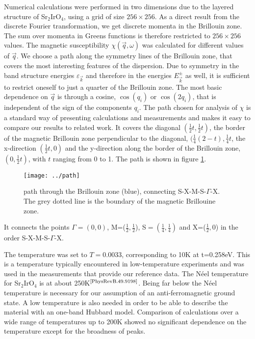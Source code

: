 \documentclass[a4paper,12pt]{report}
\begin{document}
Numerical calculations were performed in two dimensions due to the layered structure of Sr$_2$IrO$_4$, 
using a grid of size $256\times256$.
As a direct result from the discrete Fourier transformation, we get discrete momenta in the Brillouin zone.
The sum over momenta in Greens functions is therefore restricted to $256\times256$ values.
The magnetic susceptibility $\chi(\vec q,\omega)$ was calculated for different values of $\vec q$.
We choose a path along the symmetry lines of the Brillouin zone, that covers the most interesting features of the dispersion.
Due to symmetry in the band structure energies $\varepsilon_{\vec k}$ and therefore in the energies $E^{\pm}_{\vec k}$ as well,
it is sufficient to restrict oneself to just a quarter of the Brillouin zone.
The most basic dependence on $\vec q$ is through a cosine, $\cos (q_i)$ or $\cos(2q_i)$, that is independent of the sign of the components $q_i$.
%
The path chosen for analysis of $\chi$ is a standard way of presenting calculations and measurements and makes it easy to compare our results to related work.
It covers the diagonal $(\frac12t,\frac12t)$, 
the border of the magnetic Brillouin zone perpendicular to the diagonal, $(\frac14(2-t),\frac14t$, 
the x-direction $(\frac12t,0)$ and the y-direction along the border of the Brillouin zone, $(0,\frac12t)$, with $t$ ranging from 0 to 1.
The path is shown in figure \ref{path}.
\begin{figure}
 \label{path}
 \begin{center}
  \texttt{[image: ../path]}
  \caption{path through the Brillouin zone (blue), connecting S-X-M-S-$\Gamma$-X. The grey dotted line is the boundary of the magnetic Brillouine zone.}
 \end{center}
\end{figure}
It connects the points $\Gamma=(0,0)$, M=($\frac12,\frac12$), S$=(\frac14,\frac14)$ and X=($\frac12,0$) in the order S-X-M-S-$\Gamma$-X.

The temperature was set to $T=0.0033$, corresponding to 10K at t=0.258eV.
This is a temperature  typically encountered in low-temperature experiments and was used in the measurements that provide our reference data. 
The Néel temperature for Sr$_2$IrO$_4$ is at about 250K$^{\text{\cite{PhysRevB.49.9198}}}$.
Being far below the Néel temperature is necessary for our assumption of an anti-ferromagnetic ground state.
A low temperature is also needed in order to be able to describe the material with an one-band Hubbard model. 
Comparison of calculations over a wide range of temperatures up to 200K showed no significant dependence on the temperature except for the broadness of peaks.
\end{document}
